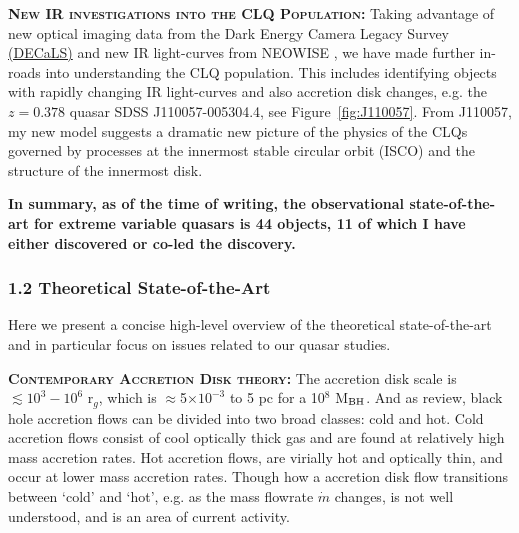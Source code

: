\smallskip
\smallskip
\noindent
\textbf{\textsc{New IR investigations into the CLQ Population:}}
Taking advantage of new optical imaging data from the Dark Energy
Camera Legacy Survey \href{http://legacysurvey.org/decamls/}{(DECaLS)}
and new IR light-curves from NEOWISE \citep{Meisner2017a, Meisner2017b}, we have made further
in-roads into understanding the CLQ population. This includes
identifying objects with rapidly changing IR light-curves and also
accretion disk changes, e.g. the $z=0.378$ quasar SDSS
J110057-005304.4, see Figure~\ref{fig:J110057}. From J110057, my new
model \citep{Ross2018} suggests a dramatic new picture of the physics of the
CLQs governed by processes at the innermost stable circular orbit
(ISCO) and the structure of the innermost disk. 

\smallskip
\smallskip
\noindent
{\bf In summary, as of the time of writing, the
observational state-of-the-art for extreme variable quasars is 44
objects, 11 of which I have either discovered or co-led the
discovery.}




\subsubsection*{1.2 Theoretical State-of-the-Art}
Here we present a concise high-level overview of the theoretical
state-of-the-art and in particular focus on issues related to our
quasar studies.

\smallskip
\smallskip
\noindent
\textbf{\textsc{Contemporary Accretion Disk theory:}}
The accretion disk scale is $\lesssim 10^{3}-10^{6}$ r$_{g}$,
which is $\approx$5$\times$$10^{-3}$ to 5 pc for a 10$^{8}$ M$_{\rm
BH}$.  
And as \citet{YuanNarayan2014} review, black hole accretion flows can be divided into two broad classes: cold and hot. Cold accretion flows consist of cool optically thick gas and are found at relatively high mass accretion rates. 
Hot accretion flows, are virially hot and optically thin, and occur at lower mass accretion rates. %
Though how a accretion disk flow transitions between `cold' and `hot', e.g. as the mass flowrate $\dot{m}$ changes, is not well understood, and is an area of current activity. %


